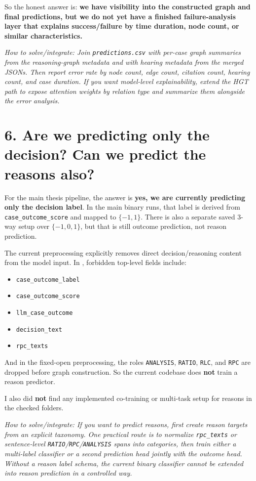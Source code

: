 \documentclass[12pt,a4paper]{article}
\newcommand{\futurework}[1]{\textcolor{futureblue}{\textit{How to solve/integrate: #1}}}
\begin{document}
So the honest answer is: \textbf{we have visibility into the constructed graph and final predictions, but we do not yet have a finished failure-analysis layer that explains success/failure by time duration, node count, or similar characteristics.}

\futurework{Join \texttt{predictions.csv} with per-case graph summaries from the reasoning-graph metadata and with hearing metadata from the merged JSONs. Then report error rate by node count, edge count, citation count, hearing count, and case duration. If you want model-level explainability, extend the HGT path to expose attention weights by relation type and summarize them alongside the error analysis.}

\section*{6. Are we predicting only the decision? Can we predict the reasons also?}

For the main thesis pipeline, the answer is \textbf{yes, we are currently predicting only the decision label}. In the main binary runs, that label is derived from \texttt{case\_outcome\_score} and mapped to \(\{-1, 1\}\). There is also a separate saved 3-way setup over \(\{-1, 0, 1\}\), but that is still outcome prediction, not reason prediction.

The current preprocessing explicitly removes direct decision/reasoning content from the model input. In , forbidden top-level fields include:

\begin{itemize}[noitemsep]
\item \texttt{case\_outcome\_label}
\item \texttt{case\_outcome\_score}
\item \texttt{llm\_case\_outcome}
\item \texttt{decision\_text}
\item \texttt{rpc\_texts}
\end{itemize}

And in the fixed-open preprocessing, the roles \texttt{ANALYSIS}, \texttt{RATIO}, \texttt{RLC}, and \texttt{RPC} are dropped before graph construction. So the current codebase does \textbf{not} train a reason predictor.

I also did \textbf{not} find any implemented co-training or multi-task setup for reasons in the checked folders.

\futurework{If you want to predict reasons, first create reason targets from an explicit taxonomy. One practical route is to normalize \texttt{rpc\_texts} or sentence-level \texttt{RATIO}/\texttt{RPC}/\texttt{ANALYSIS} spans into categories, then train either a multi-label classifier or a second prediction head jointly with the outcome head. Without a reason label schema, the current binary classifier cannot be extended into reason prediction in a controlled way.}
\end{document}
